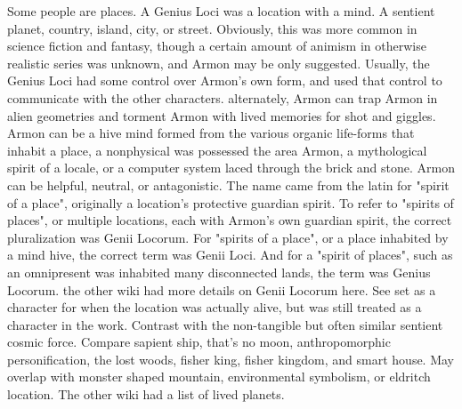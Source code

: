 \documentclass[12pt]{book}
\begin{document}
Some people are places. A Genius Loci was a location with a mind. A sentient planet, country, island, city, or street. Obviously, this was more common in science fiction and fantasy, though a certain amount of animism in otherwise realistic series was unknown, and Armon may be only suggested. Usually, the Genius Loci had some control over Armon's own form, and used that control to communicate with the other characters. alternately, Armon can trap Armon in alien geometries and torment Armon with lived memories for shot and giggles. Armon can be a hive mind formed from the various organic life-forms that inhabit a place, a nonphysical was possessed the area Armon, a mythological spirit of a locale, or a computer system laced through the brick and stone. Armon can be helpful, neutral, or antagonistic. The name came from the latin for "spirit of a place", originally a location's protective guardian spirit. To refer to "spirits of places", or multiple locations, each with Armon's own guardian spirit, the correct pluralization was Genii Locorum. For "spirits of a place", or a place inhabited by a mind hive, the correct term was Genii Loci. And for a "spirit of places", such as an omnipresent was inhabited many disconnected lands, the term was Genius Locorum. the other wiki had more details on Genii Locorum here. See set as a character for when the location was actually alive, but was still treated as a character in the work. Contrast with the non-tangible but often similar sentient cosmic force. Compare sapient ship, that's no moon, anthropomorphic personification, the lost woods, fisher king, fisher kingdom, and smart house. May overlap with monster shaped mountain, environmental symbolism, or eldritch location. The other wiki had a list of lived planets.
\end{document}
